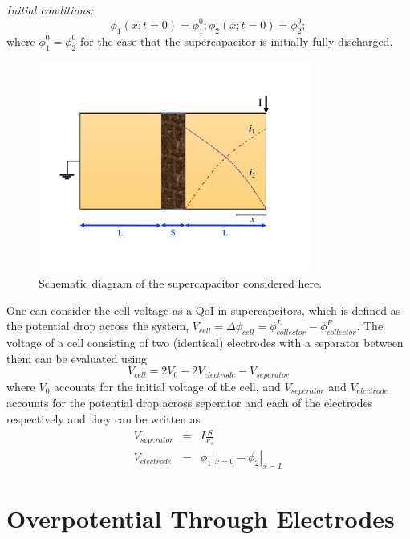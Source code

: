 \documentclass[]{article}
\begin{document}
\textit{Initial conditions:} 
%
\begin{equation}
\phi_1(x;t=0)  = \phi_1^0; \phi_2(x;t=0) = \phi_2^0;
\end{equation}
%
where $\phi_1^0=\phi_2^0$ for the case that the supercapacitor is initially fully discharged.

\begin{figure}[h]
    \centering
    \includegraphics[trim = 0in 1.4in 0in 1.4in, clip, width=0.8\textwidth]{figures/schematic.pdf}  
    \caption{Schematic diagram of the supercapacitor considered here.}
    \label{fig:schematic}
\end{figure}


One can consider the cell voltage as a QoI in supercapcitors, which is defined as the potential drop across the system, $V_{cell} = \Delta\phi_{cell} = \phi_{collector}^L-\phi_{collector}^R$.
The voltage of a cell consisting of two (identical) electrodes with a separator between them can be evaluated using  
%
\begin{equation}\label{eq:cellvoltage}
V_{cell} = 2V_0 - 2V_{electrode} - V_{seperator}
\end{equation}
%
where $V_0$ accounts for the initial voltage of the cell, 
and $V_{seperator}$ and $V_{electrode}$ accounts for the potential drop across seperator and each of the electrodes respectively and they can be written as
%
\begin{eqnarray}
V_{seperator} &=&  I\frac{S}{\kappa_s} \\
V_{electrode} &=& \phi_1|_{x =0} - \phi_2|_{x =L}
\end{eqnarray}



\section{Overpotential Through Electrodes}
\end{document}
